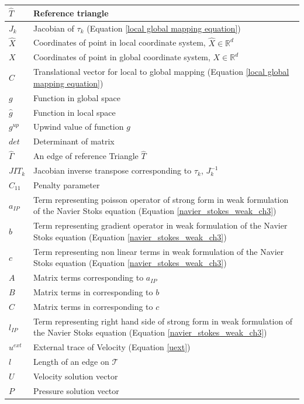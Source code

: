 \documentclass[a4paper]{book}
\begin{document}
\begin{longtable}{| p{} | p{} |}
\hline
$\hat{T}$ & Reference triangle\\
\hline
$J_k$ & Jacobian of $\tau_k$ (Equation \ref{local global mapping equation})\\
\hline
$\hat{X}$ & Coordinates of point in local coordinate system, $\hat{X} \in \mathbb{R}^d$\\
\hline
$X$ & Coordinates of point in global coordinate system, $X \in \mathbb{R}^d$\\
\hline
$C$ & Translational vector for local to global mapping (Equation \ref{local global mapping equation})\\
\hline
$g$ & Function in global space \\
\hline
$\hat{g}$ & Function in local space \\
\hline
$g^{up}$ & Upwind value of function $g$\\
\hline
$det$ & Determinant of matrix \\
\hline
$\hat{\Gamma}$ & An edge of reference Triangle $\hat{T}$\\
\hline
$JIT_k$ & Jacobian inverse transpose corresponding to $\tau_k$, $J_k^{-1}$\\
\hline
$C_{11}$ & Penalty parameter \\
\hline
$a_{IP}$ & Term representing poisson operator of strong form in weak formulation of the Navier Stoks equation (Equation \eqref{navier_stokes_weak_ch3}) \\
\hline
$b$ & Term representing gradient operator in weak formulation of the Navier Stoks equation (Equation \eqref{navier_stokes_weak_ch3})\\
\hline
$c$ & Term representing non linear terms in weak formulation of the Navier Stoks equation (Equation \eqref{navier_stokes_weak_ch3})\\
\hline
$A$ & Matrix terms corresponding to $a_{IP}$\\
\hline
$B$ & Matrix terms in corresponding to $b$\\
\hline
$C$ & Matrix terms in corresponding to $c$\\
\hline
$l_{IP}$ & Term representing right hand side of strong form in weak formulation of the Navier Stoks equation (Equation \eqref{navier_stokes_weak_ch3}) \\
\hline
$u^{ext}$ & External trace of Velocity (Equation \ref{uext})\\
\hline
$l$ & Length of an edge on $\mathcal{T}$\\
\hline
$U$ & Velocity solution vector \\
\hline
$P$ & Pressure solution vector\\

\end{longtable}
\end{document}
